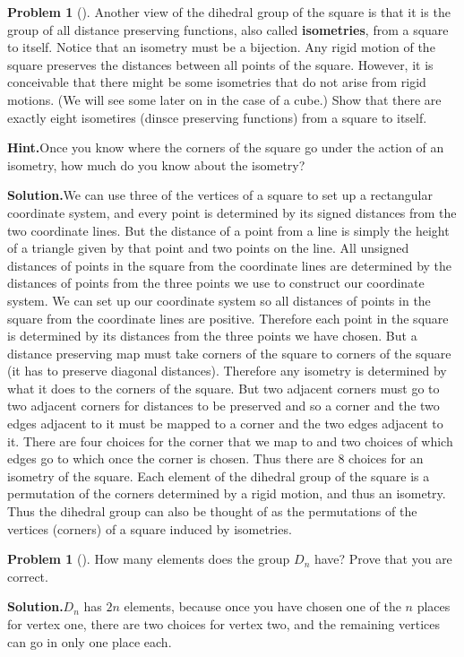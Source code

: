 \documentclass[10pt,]{book}
\newcommand{\terminology}[1]{\textbf{#1}}
\theoremstyle{plain}
\theoremstyle{definition}
\newtheorem{activity}[project]{Problem}
\theoremstyle{definition}
\numberwithin{equation}{chapter}
\begin{document}
\begin{activity}[]\label{activity-261}
Another view of the dihedral group of the square is that it is the group of all distance preserving functions, also called \terminology{isometries},  from a square to itself.  Notice that an isometry must be a bijection.  Any rigid motion of the square preserves the distances between all points of the square.  However, it is conceivable that there might be some isometries that do not arise from rigid motions.  (We will see some later on in the case of a cube.)  Show that there are exactly eight isometires (dinsce preserving functions) from a square to itself.%
\par\medskip\noindent%
\textbf{Hint.}\quad Once you know where the corners of the square go under the action of an isometry, how much do you know about the isometry?%
\par\medskip\noindent%
\textbf{Solution.}\quad We can use three of the vertices of a square to set up a rectangular coordinate system, and every point is determined by its signed distances from the two coordinate lines. But the distance of a point from a line is simply the height of a triangle given by that point and two points on the line. All unsigned distances of points in the square from the coordinate lines are determined by the distances of points from the three points we use to construct our coordinate system. We can set up our coordinate system so all distances of points in the square from the coordinate lines are positive. Therefore each point in the square is determined by its distances from the three points we have chosen. But a distance preserving map must take corners of the square to corners of the square (it has to preserve diagonal distances). Therefore any isometry is determined by what it does to the corners of the square. But two adjacent corners must go to two adjacent corners for distances to be preserved and so a corner and the two edges adjacent to it must be mapped to a corner and the two edges adjacent to it. There are four choices for the corner that we map to and two choices of which edges go to which once the corner is chosen. Thus there are 8 choices for an isometry of the square. Each element of the dihedral group of the square is a permutation of the corners determined by a rigid motion, and thus an isometry. Thus the dihedral group can also be thought of as the permutations of the vertices (corners) of a square induced by isometries.%
\end{activity}
\begin{activity}[]\label{activity-262}
How many elements does the group \(D_n\) have? Prove that you are correct.%
\par\medskip\noindent%
\textbf{Solution.}\quad \(D_n\) has \(2n\) elements, because once you have chosen one of the \(n\) places for vertex one, there are two choices for vertex two, and the remaining vertices can go in only one place each.%
\end{activity}
\end{document}
